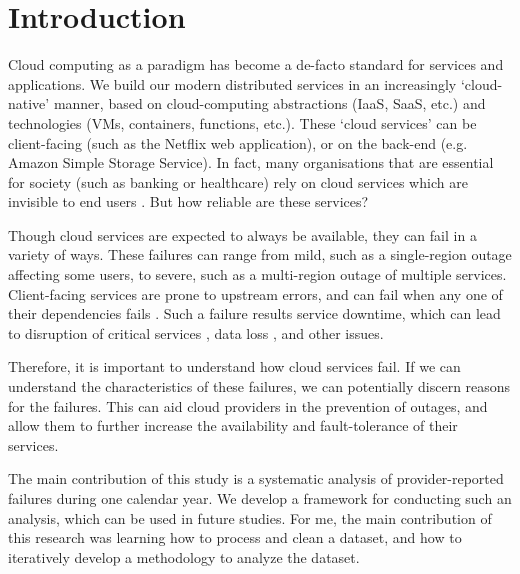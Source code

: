 \section{Introduction}
Cloud computing as a paradigm has become a de-facto standard for services and applications.
We build our modern distributed services in an increasingly `cloud-native' manner, based on cloud-computing abstractions (IaaS, SaaS, etc.) and technologies (VMs, containers, functions, etc.).
These `cloud services' can be client-facing (such as the Netflix web application), or on the back-end (e.g. Amazon Simple Storage Service).
In fact, many organisations that are essential for society (such as banking or healthcare) rely on cloud services which are invisible to end users \cite{armbrust2010,dean2015}.
But how reliable are these services?

Though cloud services are expected to always be available, they can fail in a variety of ways.
These failures can range from mild, such as a single-region outage affecting some users, to severe, such as a multi-region outage of multiple services.
Client-facing services are prone to upstream errors, and can fail when any one of their dependencies fails \cite{steen2016}.
Such a failure results service downtime, which can lead to disruption of critical services \cite{emergencyOnCloud,healthcareCrash}, data loss \cite{tencentDataLoss}, and other issues.

Therefore, it is important to understand how cloud services fail.
If we can understand the characteristics of these failures, we can potentially discern reasons for the failures.
This can aid cloud providers in the prevention of outages, and allow them to further increase the availability and fault-tolerance of their services.


The main contribution of this study is a systematic analysis of provider-reported failures during one calendar year.
We develop a framework for conducting such an analysis, which can be used in future studies.
For me, the main contribution of this research was learning how to process and clean a dataset, and how to iteratively develop a methodology to analyze the dataset.
